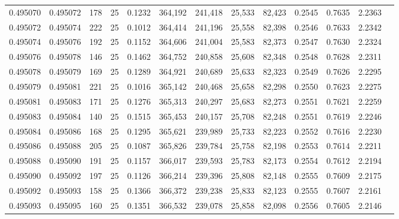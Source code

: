 \begin{tabular}{rrrrrrrrrrrrr}
0.495070 & 0.495072 &   178 &  25 &                                     0.1232 & 364,192 & 241,418 &  25,533 &  82,423 & 0.2545 & 0.7635 & 2.2363 \\
0.495072 & 0.495074 &   222 &  25 &                                     0.1012 & 364,414 & 241,196 &  25,558 &  82,398 & 0.2546 & 0.7633 & 2.2342 \\
0.495074 & 0.495076 &   192 &  25 &                                     0.1152 & 364,606 & 241,004 &  25,583 &  82,373 & 0.2547 & 0.7630 & 2.2324 \\
0.495076 & 0.495078 &   146 &  25 &                                     0.1462 & 364,752 & 240,858 &  25,608 &  82,348 & 0.2548 & 0.7628 & 2.2311 \\
0.495078 & 0.495079 &   169 &  25 &                                     0.1289 & 364,921 & 240,689 &  25,633 &  82,323 & 0.2549 & 0.7626 & 2.2295 \\
0.495079 & 0.495081 &   221 &  25 &                                     0.1016 & 365,142 & 240,468 &  25,658 &  82,298 & 0.2550 & 0.7623 & 2.2275 \\
0.495081 & 0.495083 &   171 &  25 &                                     0.1276 & 365,313 & 240,297 &  25,683 &  82,273 & 0.2551 & 0.7621 & 2.2259 \\
0.495083 & 0.495084 &   140 &  25 &                                     0.1515 & 365,453 & 240,157 &  25,708 &  82,248 & 0.2551 & 0.7619 & 2.2246 \\
0.495084 & 0.495086 &   168 &  25 &                                     0.1295 & 365,621 & 239,989 &  25,733 &  82,223 & 0.2552 & 0.7616 & 2.2230 \\
0.495086 & 0.495088 &   205 &  25 &                                     0.1087 & 365,826 & 239,784 &  25,758 &  82,198 & 0.2553 & 0.7614 & 2.2211 \\
0.495088 & 0.495090 &   191 &  25 &                                     0.1157 & 366,017 & 239,593 &  25,783 &  82,173 & 0.2554 & 0.7612 & 2.2194 \\
0.495090 & 0.495092 &   197 &  25 &                                     0.1126 & 366,214 & 239,396 &  25,808 &  82,148 & 0.2555 & 0.7609 & 2.2175 \\
0.495092 & 0.495093 &   158 &  25 &                                     0.1366 & 366,372 & 239,238 &  25,833 &  82,123 & 0.2555 & 0.7607 & 2.2161 \\
0.495093 & 0.495095 &   160 &  25 &                                     0.1351 & 366,532 & 239,078 &  25,858 &  82,098 & 0.2556 & 0.7605 & 2.2146 \\

\end{tabular}
